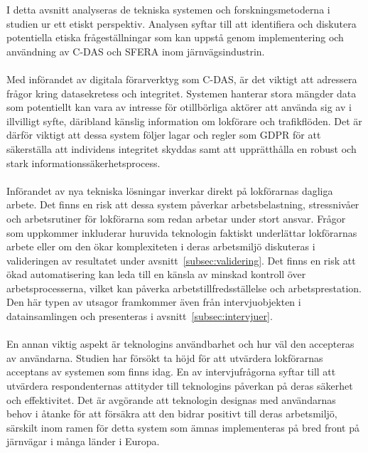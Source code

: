 I detta avsnitt analyseras de tekniska systemen och forskningsmetoderna i studien ur ett etiskt perspektiv.
Analysen syftar till att identifiera och diskutera potentiella etiska frågeställningar som kan uppstå genom implementering och användning av C-DAS och SFERA inom järnvägsindustrin.
\paragraph{}
\hspace{-15pt}
Med införandet av digitala förarverktyg som C-DAS, är det viktigt att adressera frågor kring datasekretess och integritet.
Systemen hanterar stora mängder data som potentiellt kan vara av intresse för otillbörliga aktörer att använda sig av i illvilligt syfte, däribland känslig information om lokförare och trafikflöden.
Det är därför viktigt att dessa system följer lagar och regler som GDPR för att säkerställa att individens integritet skyddas samt att upprätthålla en robust och stark informationssäkerhetsprocess.
\paragraph{}
\hspace{-15pt}
Införandet av nya tekniska lösningar inverkar direkt på lokförarnas dagliga arbete.
Det finns en risk att dessa system påverkar arbetsbelastning, stressnivåer och arbetsrutiner för lokförarna som redan arbetar under stort ansvar.
Frågor som uppkommer inkluderar huruvida teknologin faktiskt underlättar lokförarnas arbete eller om den ökar komplexiteten i deras arbetsmiljö diskuteras i valideringen av resultatet under avsnitt~\ref{subsec:validering}.
Det finns en risk att ökad automatisering kan leda till en känsla av minskad kontroll över arbetsprocesserna, vilket kan påverka arbetstillfredsställelse och arbetsprestation.
Den här typen av utsagor framkommer även från intervjuobjekten i datainsamlingen och presenteras i avsnitt~\ref{subsec:intervjuer}.
\paragraph{}
\hspace{-15pt}
En annan viktig aspekt är teknologins användbarhet och hur väl den accepteras av användarna.
Studien har försökt ta höjd för att utvärdera lokförarnas acceptans av systemen som finns idag.
En av intervjufrågorna syftar till att utvärdera respondenternas attityder till teknologins påverkan på deras säkerhet och effektivitet.
Det är avgörande att teknologin designas med användarnas behov i åtanke för att försäkra att den bidrar positivt till deras arbetsmiljö, särskilt inom ramen för detta system som ämnas implementeras på bred front på järnvägar i många länder i Europa.
